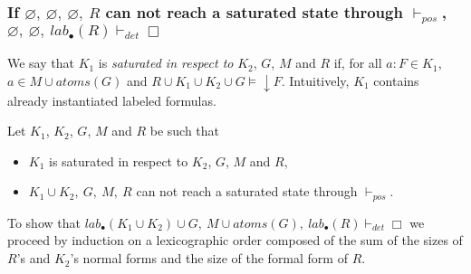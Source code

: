 \documentclass[a4paper,10pt]{article}
\newcommand{\atoms}{\mathit{atoms}}
\newcommand{\pos}{\vdash_\mathit{pos}}
\newcommand{\dett}{\vdash_\mathit{det}}
\newcommand{\T}{\mathit{lab}}
\begin{document}
\subsubsection*{If $\varnothing,\ \varnothing,\ \varnothing,\ R$ can not reach a 
saturated state through $\pos$, $\varnothing,\ \varnothing,\ \T_\bullet(R)\dett\Box$}
We say that $K_1$ is \emph{saturated in respect to} $K_2$, $G$, $M$ and $R$ if, for all
$a:F\in K_1$, $a\in M\cup\atoms(G)$ and $R\cup K_1\cup K_2\cup G\vDash\downarrow F$. Intuitively,
$K_1$ contains already instantiated labeled formulas.

\noindent
Let $K_1$, $K_2$, $G$, $M$ and $R$ be such that
\begin{itemize}
 \item $K_1$ is saturated in respect to $K_2$, $G$, $M$ and $R$,
 \item $K_1\cup K_2,\ G,\ M,\ R$ can not reach a saturated state through $\pos$.
\end{itemize}
To show that 
$\T_\bullet(K_1\cup K_2)\cup G,\ M\cup\atoms(G),\ \T_\bullet(R)\dett\Box$ we proceed by induction
on a lexicographic order composed of the sum of the sizes of $R$'s and $K_2$'s normal forms
and the size of the formal form of $R$.
\end{document}
